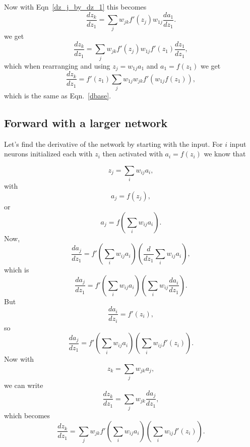 \documentclass[12pt]{article}
\begin{document}
Now with Eqn~\ref{dz_j_by_dz_1} this becomes
\begin{equation}
\frac{dz_k}{dz_1}=\sum_j w_{jk}f'(z_j)w_{1j}\frac{da_1}{dz_1}.
\end{equation}
we get
\begin{equation}
\frac{dz_k}{dz_1}=\sum_j w_{jk}f'(z_j)w_{1j}f'(z_1)\frac{dz_1}{dz_1},
\end{equation}
which when rearranging and using $z_j=w_{1j}a_1$ and $a_1=f(z_1)$ we get
\begin{equation}
\frac{dz_k}{dz_1}=f'(z_1)\sum_j w_{1j} w_{jk}f'(w_{1j}f(z_1)),
\end{equation}
which is the same as Eqn.~\ref{dbase}.

\subsection{Forward with a larger network}

Let's find the derivative of the network by starting with the input. For $i$ input neurons initialized each with $z_i$ then activated with $a_i=f(z_i)$ we know that 

\begin{equation}
z_j=\sum_i w_{ij}a_i,
\end{equation}
with
\begin{equation}
a_j=f(z_j),
\end{equation}
or
\begin{equation}
a_j=f\left(\sum_i w_{ij}a_i\right).
\end{equation}
Now,
\begin{equation}
\frac{da_j}{dz_1}=f'\left(\sum_i w_{ij}a_i\right)\left(\frac{d}{dz_1}\sum_i w_{ij}a_i\right),
\end{equation}
which is
\begin{equation}
\frac{da_j}{dz_1}=f'\left(\sum_i w_{ij}a_i\right)\left(\sum_i w_{ij}\frac{da_i}{dz_1}\right).
\end{equation}
But
\begin{equation}
\frac{da_i}{dz_i}=f'(z_i),
\end{equation}
so
\begin{equation}
\label{dcore1}
\frac{da_j}{dz_1}=f'\left(\sum_i w_{ij}a_i\right)\left(\sum_i w_{ij}f'(z_i)\right).
\end{equation}
Now with
\begin{equation}
z_k=\sum_j w_{jk} a_j,
\end{equation}
we can write
\begin{equation}
\frac{dz_k}{dz_1}=\sum_j w_{jk}\frac{da_j}{dz_1},
\end{equation}
which becomes
\begin{equation}
\label{dgen}
\frac{dz_k}{dz_1}=\sum_j w_{jk}f'\left(\sum_i w_{ij}a_i\right)\left(\sum_i w_{ij}f'(z_i)\right).
\end{equation}
\end{document}
